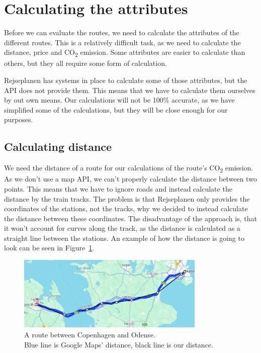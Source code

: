 \section{Calculating the attributes}\label{sec:calculations}

Before we can evaluate the routes, we need to calculate the attributes of the different routes.
This is a relatively difficult task, as we need to calculate the distance, price and \unit{CO_{2}} emission.
Some attributes are easier to calculate than others, but they all require some form of calculation.

Rejseplanen has systems in place to calculate some of those attributes, but the API does not provide them.
This means that we have to calculate them ourselves by out own means.
Our calculations will not be 100\% accurate, as we have simplified some of the calculations, but they will be close
enough for our purposes.

\subsection{Calculating distance}\label{subsec:calculating-distance}

We need the distance of a route for our calculations of the route's \unit{CO_{2}} emission.
As we don't use a map API, we can't properly calculate the distance between two points.
This means that we have to ignore roads and instead calculate the distance by the train tracks.
The problem is that Rejseplanen only provides the coordinates of the stations, not the tracks, why we decided to instead
calculate the distance between these coordinates.
The disadvantage of the approach is, that it won't account for curves along the track, as the distance is calculated as
a straight line between the stations.
An example of how the distance is going to look can be seen in Figure~\ref{fig:image-google-maps-distance-calculation}.


\begin{figure}[H]
    \centering
    \includegraphics[width=0.8\textwidth]{images/google-maps-distance-calculation}
    \caption{A route between Copenhagen and Odense. \\ Blue line is Google Maps' distance, black line is our distance.}
    \label{fig:image-google-maps-distance-calculation}
\end{figure}

